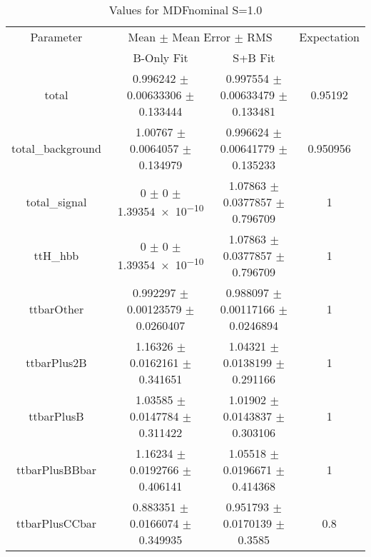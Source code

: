 \begin{table}
\centering
\caption{Values for MDFnominal S=1.0}
\begin{tabular}{cccc}
\toprule
Parameter & \multicolumn{2}{c}{Mean $\pm$ Mean Error $\pm$ RMS} & Expectation\\
 & B-Only Fit & S+B Fit & \\
\midrule
total & \num{0.996242} $\pm$ \num{0.00633306} $\pm$ \num{0.133444} & \num{0.997554} $\pm$ \num{0.00633479} $\pm$ \num{0.133481} & \num{0.95192}\\
total\_background & \num{1.00767} $\pm$ \num{0.0064057} $\pm$ \num{0.134979} & \num{0.996624} $\pm$ \num{0.00641779} $\pm$ \num{0.135233} & \num{0.950956}\\
total\_signal & \num{0} $\pm$ \num{0} $\pm$ \num{1.39354e-10} & \num{1.07863} $\pm$ \num{0.0377857} $\pm$ \num{0.796709} & \num{1}\\
ttH\_hbb & \num{0} $\pm$ \num{0} $\pm$ \num{1.39354e-10} & \num{1.07863} $\pm$ \num{0.0377857} $\pm$ \num{0.796709} & \num{1}\\
ttbarOther & \num{0.992297} $\pm$ \num{0.00123579} $\pm$ \num{0.0260407} & \num{0.988097} $\pm$ \num{0.00117166} $\pm$ \num{0.0246894} & \num{1}\\
ttbarPlus2B & \num{1.16326} $\pm$ \num{0.0162161} $\pm$ \num{0.341651} & \num{1.04321} $\pm$ \num{0.0138199} $\pm$ \num{0.291166} & \num{1}\\
ttbarPlusB & \num{1.03585} $\pm$ \num{0.0147784} $\pm$ \num{0.311422} & \num{1.01902} $\pm$ \num{0.0143837} $\pm$ \num{0.303106} & \num{1}\\
ttbarPlusBBbar & \num{1.16234} $\pm$ \num{0.0192766} $\pm$ \num{0.406141} & \num{1.05518} $\pm$ \num{0.0196671} $\pm$ \num{0.414368} & \num{1}\\
ttbarPlusCCbar & \num{0.883351} $\pm$ \num{0.0166074} $\pm$ \num{0.349935} & \num{0.951793} $\pm$ \num{0.0170139} $\pm$ \num{0.3585} & \num{0.8}\\
\bottomrule
\end{tabular}
\end{table}